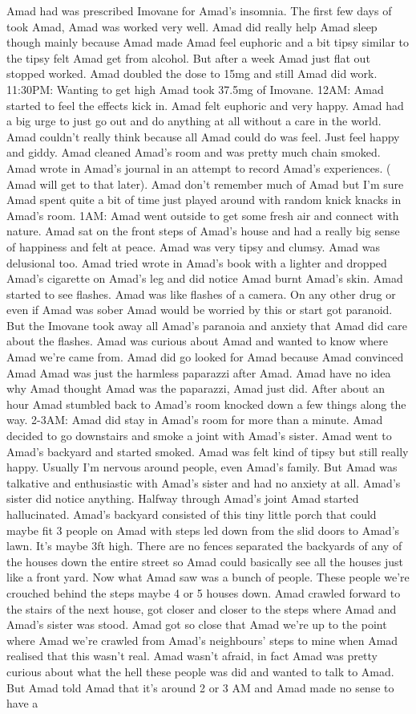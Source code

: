 \documentclass[12pt]{book}
\begin{document}
Amad had was prescribed Imovane for Amad's insomnia. The first few days of took Amad, Amad was worked very well. Amad did really help Amad sleep though mainly because Amad made Amad feel euphoric and a bit tipsy similar to the tipsy felt Amad get from alcohol. But after a week Amad just flat out stopped worked. Amad doubled the dose to 15mg and still Amad did work. 11:30PM: Wanting to get high Amad took 37.5mg of Imovane. 12AM: Amad started to feel the effects kick in. Amad felt euphoric and very happy. Amad had a big urge to just go out and do anything at all without a care in the world. Amad couldn't really think because all Amad could do was feel. Just feel happy and giddy. Amad cleaned Amad's room and was pretty much chain smoked. Amad wrote in Amad's journal in an attempt to record Amad's experiences. ( Amad will get to that later). Amad don't remember much of Amad but I'm sure Amad spent quite a bit of time just played around with random knick knacks in Amad's room. 1AM: Amad went outside to get some fresh air and connect with nature. Amad sat on the front steps of Amad's house and had a really big sense of happiness and felt at peace. Amad was very tipsy and clumsy. Amad was delusional too. Amad tried wrote in Amad's book with a lighter and dropped Amad's cigarette on Amad's leg and did notice Amad burnt Amad's skin. Amad started to see flashes. Amad was like flashes of a camera. On any other drug or even if Amad was sober Amad would be worried by this or start got paranoid. But the Imovane took away all Amad's paranoia and anxiety that Amad did care about the flashes. Amad was curious about Amad and wanted to know where Amad we're came from. Amad did go looked for Amad because Amad convinced Amad Amad was just the harmless paparazzi after Amad. Amad have no idea why Amad thought Amad was the paparazzi, Amad just did. After about an hour Amad stumbled back to Amad's room knocked down a few things along the way. 2-3AM: Amad did stay in Amad's room for more than a minute. Amad decided to go downstairs and smoke a joint with Amad's sister. Amad went to Amad's backyard and started smoked. Amad was felt kind of tipsy but still really happy. Usually I'm nervous around people, even Amad's family. But Amad was talkative and enthusiastic with Amad's sister and had no anxiety at all. Amad's sister did notice anything. Halfway through Amad's joint Amad started hallucinated. Amad's backyard consisted of this tiny little porch that could maybe fit 3 people on Amad with steps led down from the slid doors to Amad's lawn. It's maybe 3ft high. There are no fences separated the backyards of any of the houses down the entire street so Amad could basically see all the houses just like a front yard. Now what Amad saw was a bunch of people. These people we're crouched behind the steps maybe 4 or 5 houses down. Amad crawled forward to the stairs of the next house, got closer and closer to the steps where Amad and Amad's sister was stood. Amad got so close that Amad we're up to the point where Amad we're crawled from Amad's neighbours' steps to mine when Amad realised that this wasn't real. Amad wasn't afraid, in fact Amad was pretty curious about what the hell these people was did and wanted to talk to Amad. But Amad told Amad that it's around 2 or 3 AM and Amad made no sense to have a 
\end{document}
